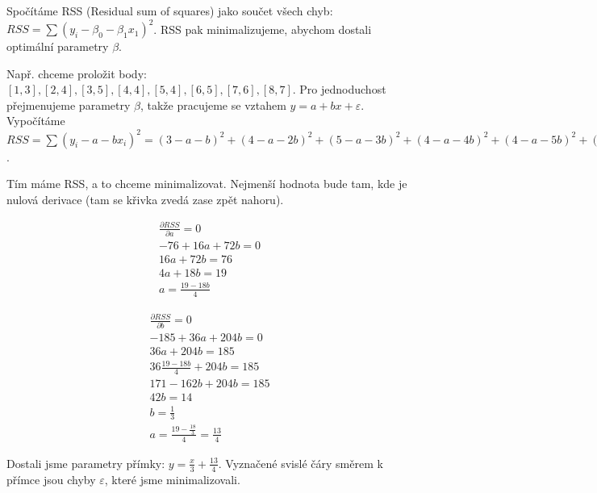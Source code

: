\documentclass[10pt,a4paper]{article}
\begin{document}
Spočítáme RSS (Residual sum of squares) jako součet všech chyb: $RSS = \sum (y_i - \beta_0 - \beta_1x_1)^2$. RSS pak minimalizujeme, abychom dostali optimální parametry $\beta$.

Např. chceme proložit body: $[1, 3], [2,4], [3,5], [4, 4], [5,4], [6,5], [7,6], [8,7]$. Pro jednoduchost přejmenujeme parametry $\beta$, takže pracujeme se vztahem $y = a + bx + \varepsilon$. Vypočítáme $RSS = \sum (y_i - a - bx_i)^2 = (3-a-b)^2 + (4-a-2b)^2 + (5-a-3b)^2 + (4-a-4b)^2 + (4-a-5b)^2 + (5-a-6b)^2 + (6-a-7b)^2 + (7-a-8b)^2 = \cdots = 192 - 76a -370b + 8a^2  + 72ab + 204b^2$.

Tím máme RSS, a to chceme minimalizovat. Nejmenší hodnota bude tam, kde je nulová derivace (tam se křivka zvedá zase zpět nahoru).


\begin{minipage}{0.45\textwidth}
\begin{equation}
\begin{split}
\frac{\partial{RSS}}{\partial{a}} = 0 \\
-76 +16a +72b = 0 \\
16a + 72b = 76 \\
4a + 18b = 19 \\
a = \frac{19 - 18b}{4}
\end{split}
\end{equation}
\end{minipage} \hfill
\begin{minipage}{0.45\textwidth}
\begin{equation}
\begin{split}
\frac{\partial{RSS}}{\partial{b}} = 0 \\
-185+36a+204b=0 \\
36a+204b=185 \\
36\frac{19-18b}{4} + 204b = 185 \\
171 -162b+204b = 185 \\
42b = 14\\
b = \frac{1}{3}\\
a = \frac{19-\frac{18}{3}}{4} = \frac{13}{4}
\end{split}
\end{equation}
\end{minipage}

Dostali jsme parametry přímky: $y = \frac{x}{3} + \frac{13}{4}$. Vyznačené svislé čáry směrem k přímce jsou chyby $\varepsilon$, které jsme minimalizovali.
\end{document}
